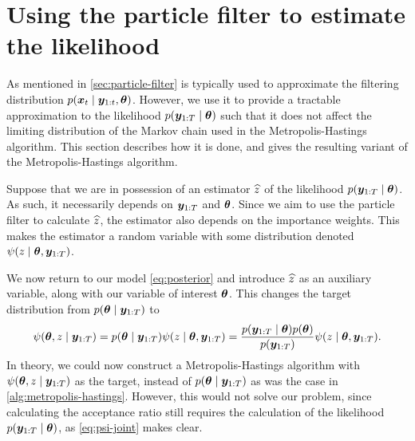 \section{Using the particle filter to estimate the likelihood} \label{sec:particle-filter-estimate}

As mentioned in \autoref{sec:particle-filter} is typically used to approximate the filtering distribution $p(\bm{x}_t \mid \bm{y}_{1:t}, \bm{\theta})$. However, we use it to provide a tractable approximation to the likelihood $p(\bm{y}_{1:T} \mid \bm{\theta})$ such that it does not affect the limiting distribution of the Markov chain used in the Metropolis-Hastings algorithm. This section describes how it is done, and gives the resulting variant of the Metropolis-Hastings algorithm.

Suppose that we are in possession of an estimator $\widehat{z}$ of the likelihood $p(\bm{y}_{1:T} \mid \bm{\theta})$. As such, it necessarily depends on $\bm{y}_{1:T}$ and $\bm{\theta}$. Since we aim to use the particle filter to calculate $\widehat{z}$, the estimator also depends on the importance weights. This makes the estimator a random variable with some distribution denoted $\psi(z \mid \bm{\theta}, \bm{y}_{1:T})$.

We now return to our model \eqref{eq:posterior} and introduce $\widehat{z}$ as an auxiliary variable, along with our variable of interest $\bm{\theta}$. This changes the target distribution from $p(\bm{\theta} \mid \bm{y}_{1:T})$ to
\begin{equation} \label{eq:psi-joint}
\psi(\bm{\theta}, z \mid \bm{y}_{1:T}) = p(\bm{\theta} \mid \bm{y}_{1:T}) \psi(z \mid \bm{\theta}, \bm{y}_{1:T}) = \frac{p(\bm{y}_{1:T} \mid \bm{\theta}) p(\bm{\theta})}{p(\bm{y}_{1:T})} \psi(z \mid \bm{\theta}, \bm{y}_{1:T}).
\end{equation}
In theory, we could now construct a Metropolis-Hastings algorithm with $\psi(\bm{\theta}, z \mid \bm{y}_{1:T})$ as the target, instead of $p(\bm{\theta} \mid \bm{y}_{1:T})$ as was the case in \autoref{alg:metropolis-hastings}. However, this would not solve our problem, since calculating the acceptance ratio still requires the calculation of the likelihood $p(\bm{y}_{1:T} \mid \bm{\theta})$, as \eqref{eq:psi-joint} makes clear.

